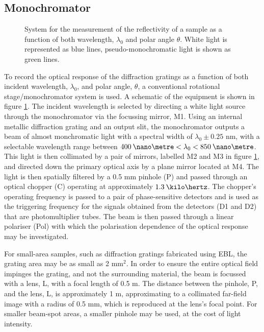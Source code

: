 \subsection{Monochromator}
\begin{figure}[h]
\centering 
\caption[System for the measurement of the reflectivity of a sample as a function of both wavelength, $\lambda_0$ and polar angle $\theta$.]{System for the measurement of the reflectivity of a sample as a function of both wavelength, $\lambda_0$ and polar angle $\theta$. White light is represented as blue lines, pseudo-monochromatic light is shown as green lines. \label{fig:monochromator}}
\end{figure}
To record the optical response of the diffraction gratings as a function of both incident wavelength, $\lambda_0$, and polar angle, $\theta$, a conventional rotational stage/monochromator system is used. A schematic of the equipment is shown in figure \ref{fig:monochromator}. The incident wavelength is selected by directing a white light source through the monochromator via the focussing mirror, M1. Using an internal metallic diffraction grating and an output slit, the monochromator outputs a beam of almost monchromatic light with a spectral width of $\lambda_0\pm0.25$ nm, with a selectable wavelength range between ${400\:\nano\metre <\lambda_0< 850\:\nano\metre}$. This light is then collimated by a pair of mirrors, labelled M2 and M3 in figure \ref{fig:monochromator}, and directed down the primary optical axis by a plane mirror located at M4. The light is then spatially filtered by a 0.5 mm pinhole (P) and passed through an optical chopper (C) operating at approximately $1.3 \:\kilo\hertz$. The chopper's operating frequency is passed to a pair of phase-sensitive detectors and is used as the triggering frequency for the signals obtained from the detectors (D1 and D2) that are photomultiplier tubes.
The beam is then passed through a linear polariser (Pol) with which the polarisation dependence of the optical response may be investigated.

For small-area samples, such as diffraction gratings fabricated using EBL, the grating area may be as small as 2 mm$^2$. In order to ensure the entire optical field impinges the grating, and not the surrounding material, the beam is focussed with a lens, L, with a focal length of 0.5 m. The distance between the pinhole, P, and the lens, L, is approximately 1 m, approximating to a collimated far-field image with a radius of 0.5 mm, which is reproduced at the lens's focal point. For smaller beam-spot areas, a smaller pinhole may be used, at the cost of light intensity. 

